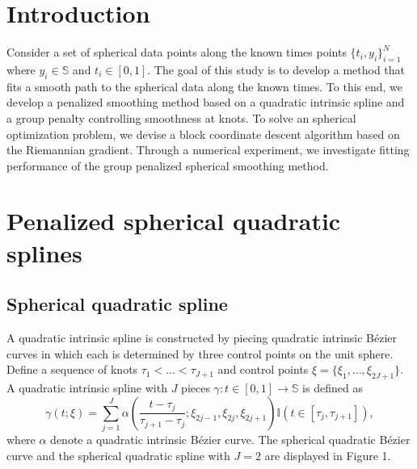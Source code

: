 \documentclass[a0,portrait]{a0poster}
\begin{document}
\begin{multicols}{2}






\normalsize
\section*{Introduction}
Consider a set of spherical data points along the known times points $\{t_i, y_i\}_{i=1}^N$ where $y_i \in \mathbb{S}$ and $t_i \in [0, 1]$.
The goal of this study is to develop a method that fits a smooth path to the spherical data along the known times.
To this end, we develop a penalized smoothing method based on a quadratic intrinsic spline and a group penalty controlling smoothness at knots.
To solve an spherical optimization problem,
we devise a block coordinate descent algorithm
based on the Riemannian gradient. Through a numerical experiment, we investigate fitting performance of the group penalized spherical smoothing method.



\section*{Penalized spherical quadratic splines}
\subsection*{Spherical quadratic spline}
A quadratic intrinsic spline is constructed by piecing quadratic intrinsic B\'ezier curves in which each is determined by three control points on the unit sphere.
Define a sequence of knots $\tau_1 < \ldots < \tau_{J+1}$ and control points $\xi = \{\xi_1, \ldots, \xi_{2J+1}\}$.
A quadratic intrinsic spline with $J$ pieces $\gamma:t \in [0, 1] \rightarrow \mathbb{S}$ is defined as
$$
\gamma(t; \xi) =
\sum_{j = 1}^J \alpha\left( \frac{t - \tau_j}{\tau_{j+1} - \tau_j}; \xi_{2j - 1}, \xi_{2j}, \xi_{2j+1} \right) \mathbb{I}(t \in [\tau_j, \tau_{j+1}]),
$$
where $\alpha$ denote a quadratic intrinsic B\'ezier curve. The spherical quadratic B\'ezier curve and the spherical quadratic spline with $J = 2$ are displayed in Figure 1.


\end{multicols}
\end{document}
